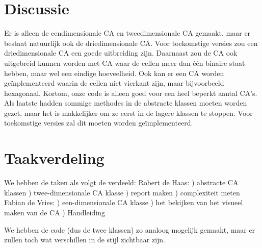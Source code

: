 \documentclass[12pt,a4paper]{article}
\begin{document}
\section*{Discussie}
Er is alleen de eendimensionale CA en tweedimensionale 
CA gemaakt, maar er bestaat natuurlijk ook de driedimensionale CA.
Voor toekomstige versies zou een driedimensionale CA een goede uitbreiding zijn.
Daarnaast zou de CA ook uitgebreid kunnen worden met CA waar de cellen meer dan één binaire staat hebben, maar wel een eindige hoeveelheid.
Ook kan er een CA worden geïnplementeerd waarin de cellen niet vierkant zijn, maar bijvoorbeeld hexagonaal.
Kortom, onze code is alleen goed voor een heel beperkt aantal CA's.
Als laatste hadden sommige methodes in de abstracte klassen moeten worden gezet, maar het 
is makkelijker om ze eerst in de lagere klassen te stoppen.
Voor toekomstige versies zal dit moeten worden geïmplementeerd. 

\section*{Taakverdeling}
We hebben de taken als volgt de verdeeld:
\vspace{6pt}
\newline
Robert de Haas:
) abstracte CA klassen
) twee-dimensionale CA klasse
) report maken
) complexiteit meten
\vspace{6pt}
\newline
Fabian de Vries:
) een-dimensionale CA klasse
) het bekijken van het visueel maken van de CA
) Handleiding
\newline


We hebben de code (dus de twee klassen) zo analoog mogelijk gemaakt, maar er zullen toch wat verschillen in de stijl zichtbaar zijn.

  
\end{document}
